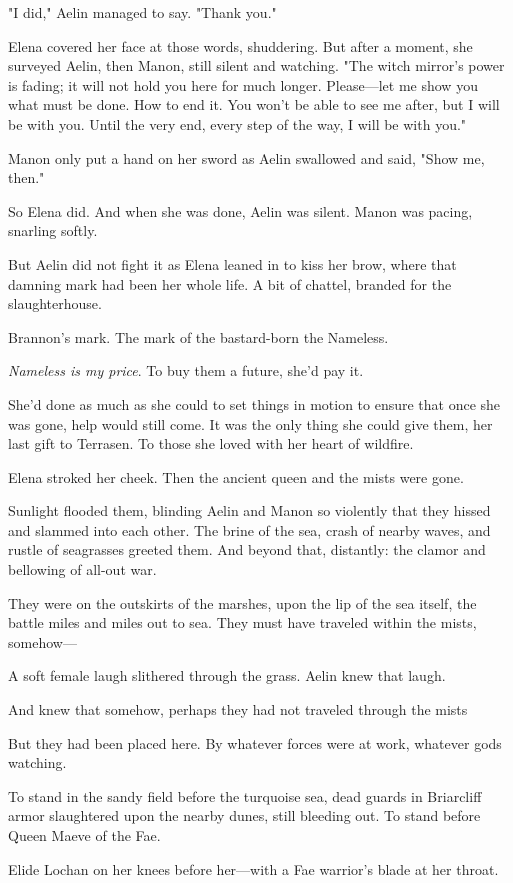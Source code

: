 "I did," Aelin managed to say. "Thank you."

Elena covered her face at those words, shuddering. But after a moment, she surveyed Aelin, then Manon, still silent and watching. "The witch mirror's power is fading; it will not hold you here for much longer. Please---let me show you what must be done. How to end it. You won't be able to see me after, but  I will be with you. Until the very end, every step of the way, I will be with you."

Manon only put a hand on her sword as Aelin swallowed and said, "Show me, then."

So Elena did. And when she was done, Aelin was silent. Manon was pacing, snarling softly.

But Aelin did not fight it as Elena leaned in to kiss her brow, where that damning mark had been her whole life. A bit of chattel, branded for the slaughterhouse.

Brannon's mark. The mark of the bastard-born  the Nameless.

\emph{Nameless is my price}. To buy them a future, she'd pay it.

She'd done as much as she could to set things in motion to ensure that once she was gone, help would still come. It was the only thing she could give them, her last gift to Terrasen. To those she loved with her heart of wildfire.

Elena stroked her cheek. Then the ancient queen and the mists were gone.

Sunlight flooded them, blinding Aelin and Manon so violently that they hissed and slammed into each other. The brine of the sea, crash of nearby waves, and rustle of seagrasses greeted them. And beyond that, distantly: the clamor and bellowing of all-out war.

They were on the outskirts of the marshes, upon the lip of the sea itself, the battle miles and miles out to sea. They must have traveled within the mists, somehow---

A soft female laugh slithered through the grass. Aelin knew that laugh.

And knew that somehow, perhaps they had not traveled through the mists


But they had been placed here. By whatever forces were at work, whatever gods watching.

To stand in the sandy field before the turquoise sea, dead guards in Briarcliff armor slaughtered upon the nearby dunes, still bleeding out. To stand before Queen Maeve of the Fae.

Elide Lochan on her knees before her---with a Fae warrior's blade at her throat.
